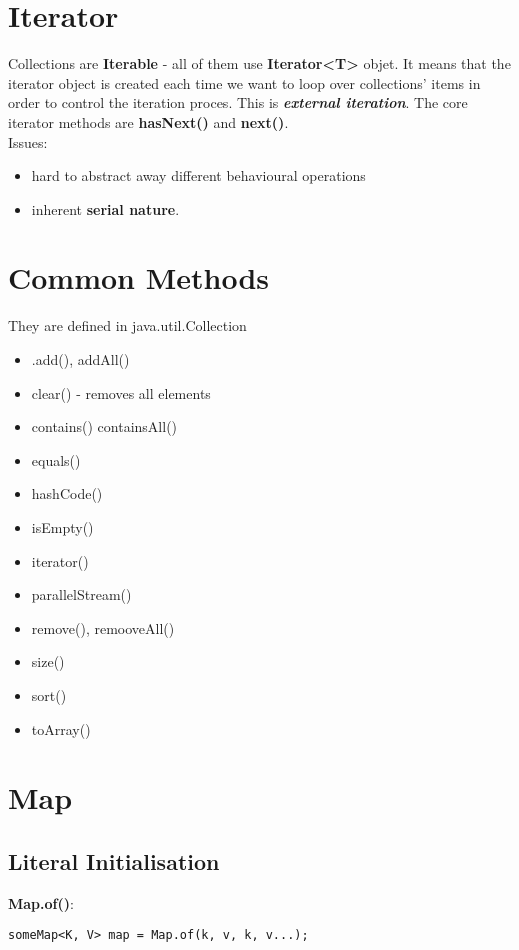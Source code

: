 \documentclass{report}
\begin{document}
\chapter{Iterator}
Collections are \textbf{Iterable} - all of them use \textbf{Iterator\textless T\textgreater} objet. It means that the iterator object is created each time we want
to loop over collections' items in order to control the iteration proces. This is \textbf{\textit{external iteration}}. The core iterator methods are \textbf{hasNext()} and \textbf{next()}.\\
Issues:
\begin{itemize}
	\item hard to abstract away different behavioural operations
	\item inherent \textbf{serial nature}.
\end{itemize}

\chapter{Common Methods}
They are defined in java.util.Collection
\begin{itemize}
	\item .add(), addAll()
	\item clear() - removes all elements
	\item contains() containsAll()
	\item equals()
	\item hashCode()
	\item isEmpty()
	\item iterator()
	\item parallelStream()
	\item remove(), remooveAll()
	\item size()
	\item sort()
	\item toArray()
\end{itemize}

\chapter{Map}
\section{Literal Initialisation}
\textbf{Map.of()}:
\begin{verbatim}
someMap<K, V> map = Map.of(k, v, k, v...);
\end{verbatim}
\end{document}

